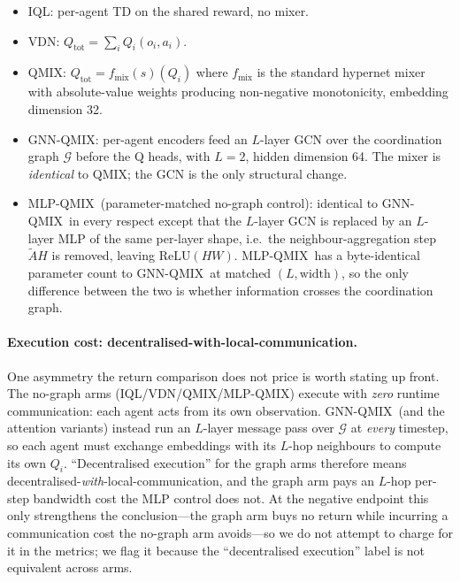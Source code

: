 \documentclass[10pt]{article}
\newcommand{\algoname}[1]{\textsc{#1}}
\newcommand{\iql}{\algoname{IQL}}
\newcommand{\vdn}{\algoname{VDN}}
\newcommand{\qmix}{\algoname{QMIX}}
\newcommand{\gnnqmix}{\algoname{GNN-QMIX}}
\newcommand{\Qtot}{Q_{\mathrm{tot}}}
\newcommand{\Qi}{Q_i}
\newcommand{\Gtask}{\mathcal{G}}
\newcommand{\mlpqmix}{\algoname{MLP-QMIX}}
\begin{document}
\begin{itemize}[leftmargin=*,itemsep=0pt,topsep=2pt]
  \item \iql: per-agent TD on the shared reward, no mixer.
  \item \vdn: $\Qtot = \sum_i \Qi(o_i, a_i)$.
  \item \qmix: $\Qtot = f_{\text{mix}}(s)(\Qi)$ where $f_{\text{mix}}$ is the
        standard hypernet mixer with absolute-value weights producing
        non-negative monotonicity, embedding dimension 32.
  \item \gnnqmix: per-agent encoders feed an $L$-layer GCN over the
        coordination graph $\Gtask$ before the Q heads, with $L=2$,
        hidden dimension 64. The mixer is \emph{identical} to \qmix; the
        GCN is the only structural change.
  \item \mlpqmix\ (parameter-matched no-graph control): identical to
        \gnnqmix\ in every respect except that the $L$-layer GCN is
        replaced by an $L$-layer MLP of the same per-layer shape, i.e.\ the neighbour-aggregation step $\tilde A H$ is removed,
        leaving $\mathrm{ReLU}(HW)$. \mlpqmix\ has a byte-identical
        parameter count to \gnnqmix\ at matched $(L, \text{width})$, so
        the only difference between the two is whether information
        crosses the coordination graph.
\end{itemize}

\paragraph{Execution cost: decentralised-with-local-communication.}
One asymmetry the return comparison does not price is worth stating up front.
The no-graph arms (\iql/\vdn/\qmix/\mlpqmix) execute with \emph{zero} runtime
communication: each agent acts from its own observation. \gnnqmix\ (and the
attention variants) instead run an $L$-layer message pass over $\Gtask$ at
\emph{every} timestep, so each agent must exchange embeddings with its $L$-hop
neighbours to compute its own $\Qi$. ``Decentralised execution'' for the graph
arms therefore means decentralised-\emph{with}-local-communication, and the
graph arm pays an $L$-hop per-step bandwidth cost the MLP control does not. At
the negative endpoint this only strengthens the conclusion---the graph arm buys
no return while incurring a communication cost the no-graph arm avoids---so we
do not attempt to charge for it in the metrics; we flag it because the
``decentralised execution'' label is not equivalent across arms.
\end{document}
